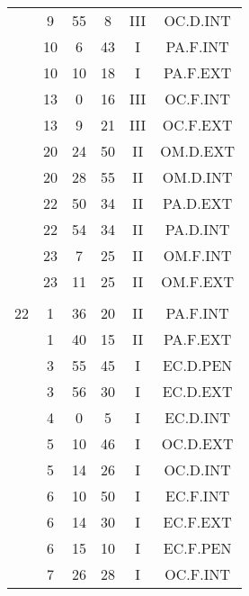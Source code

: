 \documentclass[12pt, a4paper]{article}
\begin{document}
\begin{multicols}{3}
{\begin{tabular}{c c c c c c}
	 	 	 	 & 9 & 55 & 8 & III & OC.D.INT\\%
	 	 	 	 & 10 & 6 & 43 & I & PA.F.INT\\%
	 	 	 	 & 10 & 10 & 18 & I & PA.F.EXT\\%
	 	 	 	 & 13 & 0 & 16 & III & OC.F.INT\\%
	 	 	 	 & 13 & 9 & 21 & III & OC.F.EXT\\%
	 	 	 	 & 20 & 24 & 50 & II & OM.D.EXT\\%
	 	 	 	 & 20 & 28 & 55 & II & OM.D.INT\\%
	 	 	 	 & 22 & 50 & 34 & II & PA.D.EXT\\%
	 	 	 	 & 22 & 54 & 34 & II & PA.D.INT\\%
	 	 	 	 & 23 & 7 & 25 & II & OM.F.INT\\%
	 	 	 	 & 23 & 11 & 25 & II & OM.F.EXT\\%
	 	 	 	 & & & & & \\%
	 	 	 	22 & 1 & 36 & 20 & II & PA.F.INT\\%
	 	 	 	 & 1 & 40 & 15 & II & PA.F.EXT\\%
	 	 	 	 & 3 & 55 & 45 & I & EC.D.PEN\\%
	 	 	 	 & 3 & 56 & 30 & I & EC.D.EXT\\%
	 	 	 	 & 4 & 0 & 5 & I & EC.D.INT\\%
	 	 	 	 & 5 & 10 & 46 & I & OC.D.EXT\\%
	 	 	 	 & 5 & 14 & 26 & I & OC.D.INT\\%
	 	 	 	 & 6 & 10 & 50 & I & EC.F.INT\\%
	 	 	 	 & 6 & 14 & 30 & I & EC.F.EXT\\%
	 	 	 	 & 6 & 15 & 10 & I & EC.F.PEN\\%
	 	 	 	 & 7 & 26 & 28 & I & OC.F.INT\\%

\end{tabular}}
\end{multicols}
\end{document}
